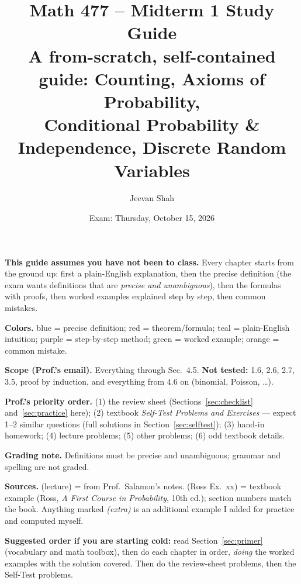 \documentclass[11pt]{article}
\title{\textbf{Math 477 -- Midterm 1 Study Guide}\\[2pt]
\large A from-scratch, self-contained guide: Counting, Axioms of Probability,\\
Conditional Probability \& Independence, Discrete Random Variables}
\author{Jeevan Shah}
\date{Exam: Thursday, October 15, 2026}
\begin{document}
\maketitle
\thispagestyle{fancy}

\begin{tcolorbox}[colback=gray!8,colframe=gray!60,title=How to use this guide]
\textbf{This guide assumes you have not been to class.} Every chapter starts from the ground up: first a plain-English explanation, then the precise definition (the exam wants definitions that are \emph{precise and unambiguous}), then the formulas with proofs, then worked examples explained step by step, then common mistakes.\par
\medskip
\textbf{Colors.} \colorbox{blue!8}{blue} = precise definition; \colorbox{red!8}{red} = theorem/formula; \colorbox{teal!12}{teal} = plain-English intuition; \colorbox{violet!10}{purple} = step-by-step method; \colorbox{green!10}{green} = worked example; \colorbox{orange!15}{orange} = common mistake.\par
\medskip
\textbf{Scope (Prof.'s email).} Everything through Sec.\ 4.5. \textbf{Not tested:} 1.6, 2.6, 2.7, 3.5, proof by induction, and everything from 4.6 on (binomial, Poisson, \dots).\par
\medskip
\textbf{Prof.'s priority order.} (1) the review sheet (Sections~\ref{sec:checklist} and~\ref{sec:practice} here); (2) textbook \emph{Self-Test Problems and Exercises} --- expect 1--2 similar questions (full solutions in Section~\ref{sec:selftest}); (3) hand-in homework; (4) lecture problems; (5) other problems; (6) odd textbook details.\par
\medskip
\textbf{Grading note.} Definitions must be precise and unambiguous; grammar and spelling are not graded.\par
\medskip
\textbf{Sources.} (lecture) = from Prof.\ Salamon's notes. (Ross Ex.\ xx) = textbook example (Ross, \emph{A First Course in Probability}, 10th ed.); section numbers match the book. Anything marked \emph{(extra)} is an additional example I added for practice and computed myself.\par
\medskip
\textbf{Suggested order if you are starting cold:} read Section~\ref{sec:primer} (vocabulary and math toolbox), then do each chapter in order, \emph{doing} the worked examples with the solution covered. Then do the review-sheet problems, then the Self-Test problems.
\end{tcolorbox}

\setcounter{tocdepth}{1}
\tableofcontents
\clearpage
\setcounter{section}{-1}
\end{document}
